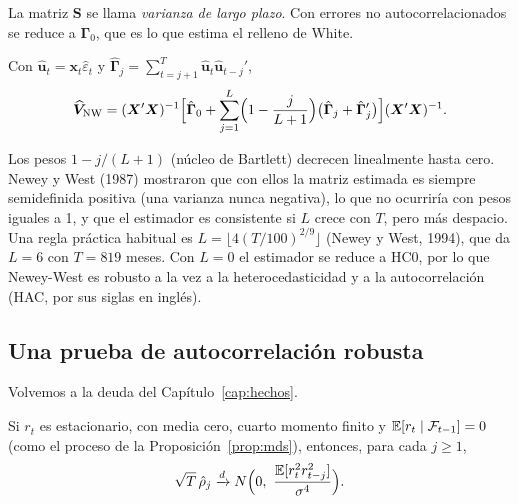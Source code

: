 La matriz $\bm S$ se llama \emph{varianza de largo plazo}. Con errores no autocorrelacionados se reduce a
$\bm\Gamma_0$, que es lo que estima el relleno de White.

\begin{definicion}
Con $\hat{\bm u}_t=\bm x_t\hat\varepsilon_t$ y $\hat{\bm\Gamma}_j=\sum_{t=j+1}^T\hat{\bm u}_t\hat{\bm u}_{t-j}'$,
\[
  \widehat{\bm V}_{\mathrm{NW}}=(\bm X'\bm X)^{-1}\Bigl[\hat{\bm\Gamma}_0+\sum_{j=1}^{L}\Bigl(1-\frac{j}{L+1}\Bigr)
  \bigl(\hat{\bm\Gamma}_j+\hat{\bm\Gamma}_j'\bigr)\Bigr](\bm X'\bm X)^{-1}.
\]
\end{definicion}

Los pesos $1-j/(L+1)$ (núcleo de Bartlett) decrecen linealmente hasta cero. Newey y West (1987) mostraron que
con ellos la matriz estimada es siempre semidefinida positiva (una varianza nunca negativa), lo que no
ocurriría con pesos iguales a 1, y que el estimador es consistente si $L$ crece con $T$, pero más despacio.
Una regla práctica habitual es $L=\lfloor4(T/100)^{2/9}\rfloor$ (Newey y West, 1994), que da $L=6$ con
$T=819$ meses. Con $L=0$ el estimador se reduce a HC0, por lo que Newey-West es robusto a la vez a la
heterocedasticidad y a la autocorrelación (HAC, por sus siglas en inglés).

\subsection{Una prueba de autocorrelación robusta}

Volvemos a la deuda del Capítulo~\ref{cap:hechos}.

\begin{proposicion}\label{prop:acfrob}
Si $r_t$ es estacionario, con media cero, cuarto momento finito y $\mathbb{E}[r_t\mid\mathcal F_{t-1}]=0$ (como el
proceso de la Proposición~\ref{prop:mds}), entonces, para cada $j\ge1$,
\[
  \sqrt T\,\hat\rho_j\xrightarrow{d}N\Bigl(0,\ \frac{\E[r_t^2r_{t-j}^2]}{\sigma^4}\Bigr).
\]
\end{proposicion}

